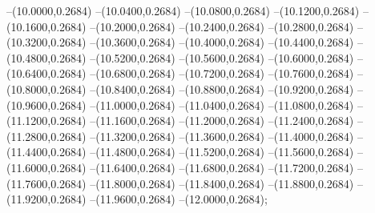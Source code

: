 {	--(10.0000,0.2684)
	--(10.0400,0.2684)
	--(10.0800,0.2684)
	--(10.1200,0.2684)
	--(10.1600,0.2684)
	--(10.2000,0.2684)
	--(10.2400,0.2684)
	--(10.2800,0.2684)
	--(10.3200,0.2684)
	--(10.3600,0.2684)
	--(10.4000,0.2684)
	--(10.4400,0.2684)
	--(10.4800,0.2684)
	--(10.5200,0.2684)
	--(10.5600,0.2684)
	--(10.6000,0.2684)
	--(10.6400,0.2684)
	--(10.6800,0.2684)
	--(10.7200,0.2684)
	--(10.7600,0.2684)
	--(10.8000,0.2684)
	--(10.8400,0.2684)
	--(10.8800,0.2684)
	--(10.9200,0.2684)
	--(10.9600,0.2684)
	--(11.0000,0.2684)
	--(11.0400,0.2684)
	--(11.0800,0.2684)
	--(11.1200,0.2684)
	--(11.1600,0.2684)
	--(11.2000,0.2684)
	--(11.2400,0.2684)
	--(11.2800,0.2684)
	--(11.3200,0.2684)
	--(11.3600,0.2684)
	--(11.4000,0.2684)
	--(11.4400,0.2684)
	--(11.4800,0.2684)
	--(11.5200,0.2684)
	--(11.5600,0.2684)
	--(11.6000,0.2684)
	--(11.6400,0.2684)
	--(11.6800,0.2684)
	--(11.7200,0.2684)
	--(11.7600,0.2684)
	--(11.8000,0.2684)
	--(11.8400,0.2684)
	--(11.8800,0.2684)
	--(11.9200,0.2684)
	--(11.9600,0.2684)
	--(12.0000,0.2684);
}
